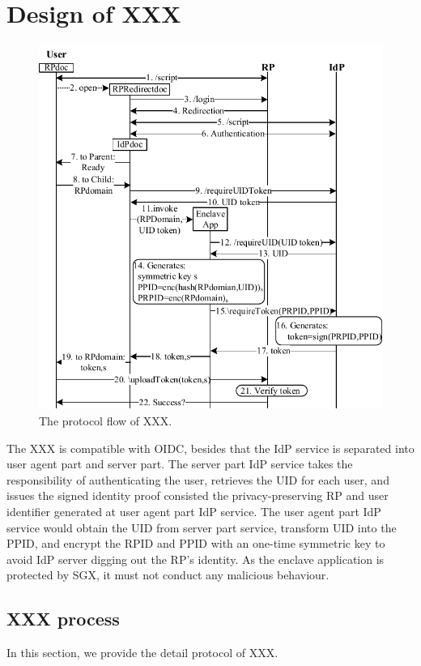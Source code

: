 \section{Design of XXX}
\label{sec:design}
\begin{figure}[t]
  \centering
  \includegraphics[width=0.95\linewidth]{fig/sgx-sso.pdf}
  \caption{The protocol flow of XXX.}
  \label{fig:XXX}
\end{figure}
The XXX is compatible with OIDC, besides that the IdP service is separated into user agent part and server part. 
The server part IdP service takes the responsibility of authenticating the user, retrieves the UID for each user, and issues the signed identity proof consisted the privacy-preserving RP and user identifier generated at user agent part IdP service.
The user agent part IdP service would obtain the UID from server part service, transform UID into the PPID, and encrypt the RPID and PPID with an one-time symmetric key to avoid IdP server digging out the RP's identity. As the enclave application is protected by SGX, it must not conduct any malicious behaviour. 

\subsection{XXX process}
In this section, we provide the detail protocol of XXX.

